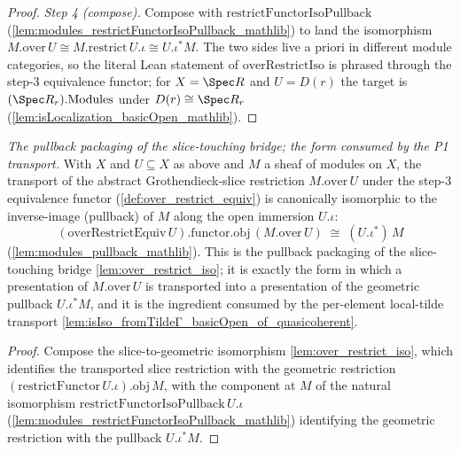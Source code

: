 \begin{proof}
  \emph{Step 4 (compose).} Compose with
  \(\mathrm{restrictFunctorIsoPullback}\) (\cref{lem:modules_restrictFunctorIsoPullback_mathlib})
  to land the isomorphism \(M.\mathrm{over}\,U \cong M.\mathrm{restrict}\,U.\iota \cong
  U.\iota^{*}M\). The two sides live a priori in different module categories, so the literal Lean
  statement of \(\mathrm{overRestrictIso}\) is phrased through the step-3 equivalence functor; for
  \(X = \Spec R\) and \(U = D(r)\) the target is \((\Spec R_r).\mathrm{Modules}\) under
  \(D(r) \cong \Spec R_r\) (\cref{lem:isLocalization_basicOpen_mathlib}).
\end{proof}


\begin{lemma}

  \label{lem:over_restrict_pullback_iso}
  \textit{The pullback packaging of the slice-touching bridge; the form consumed by the P1 transport.}
  With \(X\) and \(U \subseteq X\) as above and \(M\) a sheaf of modules on \(X\), the transport of the
  abstract Grothendieck-slice restriction \(M.\mathrm{over}\,U\) under the step-3 equivalence functor
  (\cref{def:over_restrict_equiv}) is canonically isomorphic to the inverse-image (pullback) of \(M\)
  along the open immersion \(U.\iota\):
  \[
    (\mathrm{overRestrictEquiv}\,U).\mathrm{functor}.\mathrm{obj}\,(M.\mathrm{over}\,U)
      \;\cong\; (U.\iota^{*})\,M
  \]
  (\cref{lem:modules_pullback_mathlib}). This is the pullback packaging of the slice-touching bridge
  \cref{lem:over_restrict_iso}; it is exactly the form in which a presentation of
  \(M.\mathrm{over}\,U\) is transported into a presentation of the geometric pullback \(U.\iota^{*}M\),
  and it is the ingredient consumed by the per-element local-tilde transport
  \cref{lem:isIso_fromTildeΓ_basicOpen_of_quasicoherent}.
\end{lemma}
\begin{proof}
  Compose the slice-to-geometric isomorphism \cref{lem:over_restrict_iso}, which identifies the
  transported slice restriction with the geometric restriction
  \((\mathrm{restrictFunctor}\,U.\iota).\mathrm{obj}\,M\), with the component at \(M\) of the natural
  isomorphism \(\mathrm{restrictFunctorIsoPullback}\,U.\iota\)
  (\cref{lem:modules_restrictFunctorIsoPullback_mathlib}) identifying the geometric restriction with
  the pullback \(U.\iota^{*}M\).
\end{proof}

